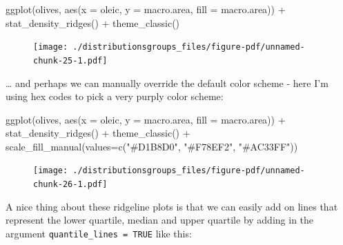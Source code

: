 \documentclass[
  letterpaper,
  DIV=11,
  numbers=noendperiod]{scrreprt}
\newenvironment{Shaded}{\begin{snugshade}}{\end{snugshade}}
\newcommand{\AttributeTok}[1]{\textcolor[rgb]{0.40,0.45,0.13}{#1}}
\newcommand{\FunctionTok}[1]{\textcolor[rgb]{0.28,0.35,0.67}{#1}}
\newcommand{\NormalTok}[1]{\textcolor[rgb]{0.00,0.23,0.31}{#1}}
\newcommand{\SpecialCharTok}[1]{\textcolor[rgb]{0.37,0.37,0.37}{#1}}
\newcommand{\StringTok}[1]{\textcolor[rgb]{0.13,0.47,0.30}{#1}}
\begin{document}
\begin{Shaded}
\begin{Highlighting}[]
\FunctionTok{ggplot}\NormalTok{(olives, }\FunctionTok{aes}\NormalTok{(}\AttributeTok{x =}\NormalTok{ oleic, }\AttributeTok{y =}\NormalTok{ macro.area, }\AttributeTok{fill =}\NormalTok{ macro.area)) }\SpecialCharTok{+}
  \FunctionTok{stat\_density\_ridges}\NormalTok{() }\SpecialCharTok{+}
  \FunctionTok{theme\_classic}\NormalTok{() }
\end{Highlighting}
\end{Shaded}

\begin{figure}[H]

{\centering \texttt{[image: ./distributionsgroups\_files/figure-pdf/unnamed-chunk-25-1.pdf]}

}

\end{figure}

\ldots{} and perhaps we can manually override the default color scheme -
here I'm using hex codes to pick a very purply color scheme:

\begin{Shaded}
\begin{Highlighting}[]
\FunctionTok{ggplot}\NormalTok{(olives, }\FunctionTok{aes}\NormalTok{(}\AttributeTok{x =}\NormalTok{ oleic, }\AttributeTok{y =}\NormalTok{ macro.area, }\AttributeTok{fill =}\NormalTok{ macro.area)) }\SpecialCharTok{+}
  \FunctionTok{stat\_density\_ridges}\NormalTok{() }\SpecialCharTok{+}
  \FunctionTok{theme\_classic}\NormalTok{() }\SpecialCharTok{+}
  \FunctionTok{scale\_fill\_manual}\NormalTok{(}\AttributeTok{values=}\FunctionTok{c}\NormalTok{(}\StringTok{"\#D1B8D0"}\NormalTok{, }\StringTok{"\#F78EF2"}\NormalTok{, }\StringTok{"\#AC33FF"}\NormalTok{))}
\end{Highlighting}
\end{Shaded}

\begin{figure}[H]

{\centering \texttt{[image: ./distributionsgroups\_files/figure-pdf/unnamed-chunk-26-1.pdf]}

}

\end{figure}

A nice thing about these ridgeline plots is that we can easily add on
lines that represent the lower quartile, median and upper quartile by
adding in the argument \texttt{quantile\_lines\ =\ TRUE} like this:
\end{document}
